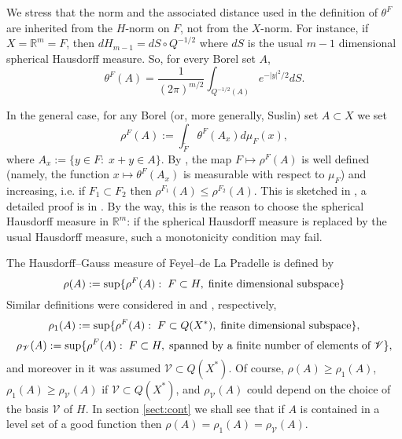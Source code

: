 \documentclass[reqno,twoside,12pt]{amsart}
\begin{document}
We stress that the norm and the associated distance used in the definition of $\theta^F$ are inherited from the $H$-norm on $F$, not from the $X$-norm. For instance, if $X= 
{\mathbb R}^m = F$, then $d H_{m-1} = dS \circ Q^{-1/2}$ where $dS$ is the usual $m-1$ dimensional spherical Hausdorff measure. So, for every Borel set $A$, 
\begin{equation}
\label{thetaF}
\theta^F(A) = \frac{1}{(2\pi)^{m/2}}\int_{Q^{-1/2}(A)} e^{-|y|^2/2}dS. 
\end{equation}

In the general case, for any Borel (or, more generally, Suslin) set $A\subset X$ we set 
\begin{equation}
\label{rhoF}
\rho^F(A) := \int_{ \widetilde{F}} \theta^F(A_x)d\mu_F(x), 
\end{equation}
where $A_x  := \{y\in F:\;x+y\in A\}$. By \cite[Prop. 3.2]{Feyel}, the map $F\mapsto \rho^F(A) $ is well defined (namely, the function $x\mapsto \theta^F(A_x)$ is measurable with respect to $\mu_F$) and increasing, i.e. if $F_1\subset F_2$ then $\rho^{F_1}(A) \leq \rho^{F_2}(A)$. This is sketched in \cite{Feyel}, a detailed proof is in \cite[Lemma 3.1]{Diego}.  By the way, this is the reason to choose the spherical Hausdorff measure in ${\mathbb R}^m$: if the spherical Hausdorff measure is replaced by  the usual Hausdorff measure, such a monotonicity condition may fail. 

The Hausdorff--Gauss measure of Feyel--de La Pradelle  is defined by 
\begin{equation}
\label{FDP}
\rho(A) := \sup\{ \rho^F(A):\;F\subset H, \;\mbox{\rm finite dimensional subspace} \}
\end{equation}
Similar definitions were considered in \cite{Diego} and \cite{Hino}, respectively,
\begin{equation}
\label{Diego}
\rho_1(A) := \sup\{ \rho^F(A):\;F\subset Q(X^*), \;\mbox{\rm finite dimensional subspace} \},
\end{equation}
\begin{equation}
\label{Hino}
\rho_{{\mathcal V}}(A) := \sup\{ \rho^F(A):\;F\subset H, \;\mbox{\rm spanned by a finite number of elements of}\; {\mathcal V}  \},
\end{equation}
and moreover  in \cite{Hino} it was assumed  ${\mathcal V}\subset Q(X^*)$. 
Of course, $\rho(A) \geq \rho_1(A)$,  $\rho_1(A)\geq \rho_{{\mathcal V}}(A) $ if ${\mathcal V}\subset Q(X^*)$, and $\rho_{{\mathcal V}}(A) $ could depend on the choice of the basis ${\mathcal V}$ of $H$.  In  section \ref{sect:cont} we shall see that if $A$ is contained in a level set of a good function then $\rho(A)= \rho_1(A)= \rho_{{\mathcal V}}(A) $. 
\end{document}
